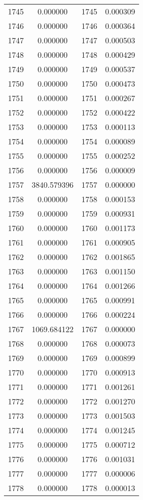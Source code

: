 \documentclass[12pt]{article}
\begin{document}
\begin{longtable}{@{}cccc@{}}
1745 & 0.000000 & 1745 & 0.000309 \\
1746 & 0.000000 & 1746 & 0.000364 \\
1747 & 0.000000 & 1747 & 0.000503 \\
1748 & 0.000000 & 1748 & 0.000429 \\
1749 & 0.000000 & 1749 & 0.000537 \\
1750 & 0.000000 & 1750 & 0.000473 \\
1751 & 0.000000 & 1751 & 0.000267 \\
1752 & 0.000000 & 1752 & 0.000422 \\
1753 & 0.000000 & 1753 & 0.000113 \\
1754 & 0.000000 & 1754 & 0.000089 \\
1755 & 0.000000 & 1755 & 0.000252 \\
1756 & 0.000000 & 1756 & 0.000009 \\
1757 & 3840.579396 & 1757 & 0.000000 \\
1758 & 0.000000 & 1758 & 0.000153 \\
1759 & 0.000000 & 1759 & 0.000931 \\
1760 & 0.000000 & 1760 & 0.001173 \\
1761 & 0.000000 & 1761 & 0.000905 \\
1762 & 0.000000 & 1762 & 0.001865 \\
1763 & 0.000000 & 1763 & 0.001150 \\
1764 & 0.000000 & 1764 & 0.001266 \\
1765 & 0.000000 & 1765 & 0.000991 \\
1766 & 0.000000 & 1766 & 0.000224 \\
1767 & 1069.684122 & 1767 & 0.000000 \\
1768 & 0.000000 & 1768 & 0.000073 \\
1769 & 0.000000 & 1769 & 0.000899 \\
1770 & 0.000000 & 1770 & 0.000913 \\
1771 & 0.000000 & 1771 & 0.001261 \\
1772 & 0.000000 & 1772 & 0.001270 \\
1773 & 0.000000 & 1773 & 0.001503 \\
1774 & 0.000000 & 1774 & 0.001245 \\
1775 & 0.000000 & 1775 & 0.000712 \\
1776 & 0.000000 & 1776 & 0.001031 \\
1777 & 0.000000 & 1777 & 0.000006 \\
1778 & 0.000000 & 1778 & 0.000013 \\

\end{longtable}
\end{document}

